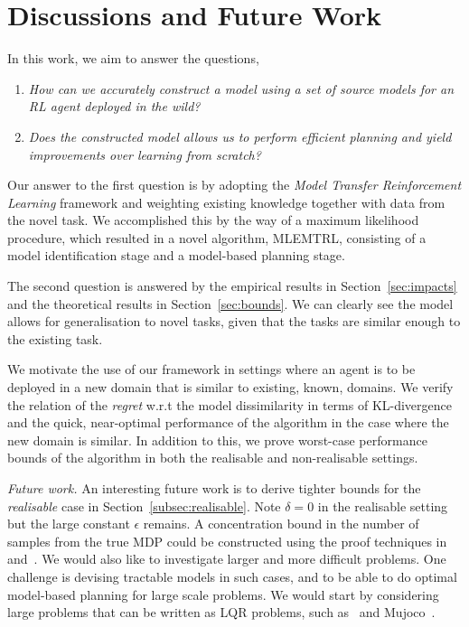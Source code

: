 
\balance

\section{Discussions and Future Work}\label{sec:discussion}
In this work, we aim to answer the questions,
\begin{enumerate}
    \item \emph{How can we accurately construct a model using a set of source models for an RL agent deployed in the wild?}
    \item \emph{Does the constructed model allows us to perform efficient planning and yield improvements over learning from scratch?}
\end{enumerate}
Our answer to the first question is by adopting the \emph{Model Transfer Reinforcement Learning} framework and weighting existing knowledge together with data from the novel task. We accomplished this by the way of a maximum likelihood procedure, which resulted in a novel algorithm, MLEMTRL, consisting of a model identification stage and a model-based planning stage. 

The second question is answered by the empirical results in Section~\ref{sec:impacts} and the theoretical results in Section~\ref{sec:bounds}. We can clearly see the model allows for generalisation to novel tasks, given that the tasks are similar enough to the existing task. 

We motivate the use of our framework in settings where an agent is to be deployed in a new domain that is similar to existing, known, domains. We verify the relation of the \emph{regret} w.r.t the model dissimilarity in terms of KL-divergence and the quick, near-optimal performance of the algorithm in the case where the new domain is similar. In addition to this, we prove worst-case performance bounds of the algorithm in both the realisable and non-realisable settings. 


\textit{Future work.} An interesting future work is to derive tighter bounds for the \emph{realisable} case in Section~\ref{subsec:realisable}. Note $\delta=0$ in the realisable setting but the large constant $\epsilon$ remains. A concentration bound in the number of samples from the true MDP could be constructed using the proof techniques in~\citet{anastasiou2019normal} and~\citet{ouhamma2022bilinear}. We would also like to investigate larger and more difficult problems. One challenge is devising tractable models in such cases, and to be able to do optimal model-based planning for large scale problems. We would start by considering large problems that can be written as LQR problems, such as~\citep{tunyasuvunakool2020dm_control} and Mujoco~\citep{todorov2012mujoco}.